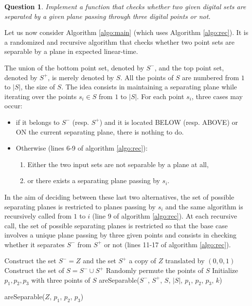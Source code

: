 \documentclass[a4paper, 11pt]{article}
\newtheorem{qu}{Question}
\begin{document}
\begin{qu}
Implement a function that checks whether two given digital sets are separated by a given plane passing through three
digital points or not.  
\end{qu}

Let us now consider Algorithm \ref{algo:main} (which uses Algorithm \ref{algo:rec}). 
It is a randomized and recursive algorithm that checks whether two point sets
 are separable by a plane in expected linear-time. 

The union of the bottom point set, denoted by $S^-$, and the top point set, denoted by $S^+$, is 
merely denoted by $S$. All the points of $S$ are numbered from $1$ to $|S|$, the size of $S$.    
The idea consists in maintaining a separating plane while iterating over the points $s_i \in S$ from $1$ to $|S|$. 
For each point $s_i$, three cases may occur:  
\begin{itemize}
 \item if it belongs to $S^-$ (resp. $S^+$) and it is located BELOW (resp. ABOVE) or ON 
the current separating plane, there is nothing to do. 
 \item Otherwise (lines 6-9 of algorithm \ref{algo:rec}): 
 \begin{enumerate}
   \item Either the two input sets are not separable by a plane at all,  
   \item or there exists a separating plane passing by $s_i$. 
 \end{enumerate}
\end{itemize}
In the aim of deciding between these last two alternatives, the set of possible separating 
planes is restricted to planes passing by $s_i$ and the same algorithm is recursively called
from $1$ to $i$ (line 9 of algorithm \ref{algo:rec}). 
At each recursive call, the set of possible separating planes is restricted so that the base case 
involves a unique plane passing by three given points and consists in checking whether it separates 
$S^-$ from $S^+$ or not (lines 11-17 of algorithm \ref{algo:rec}).  


\begin{algorithm}[Hhtbp]
  Construct the set $S^- = Z$ and the set $S^+$ a copy of $Z$ translated by $(0,0,1)$ \; 
  Construct the set of $S = S^- \cup S^+$ \; 
  Randomly permute the points of $S$ \;
  Initialize $p_1, p_2, p_3$ with three points of $S$ 
  \Return areSeparable($S^-$, $S^+$, $S$, $|S|$, $p_1$, $p_2$, $p_3$, $k$) \; 
  \caption{areSeparable($Z$, $p_1$, $p_2$, $p_3$)}
  \label{algo:main}
\end{algorithm}
\end{document}

